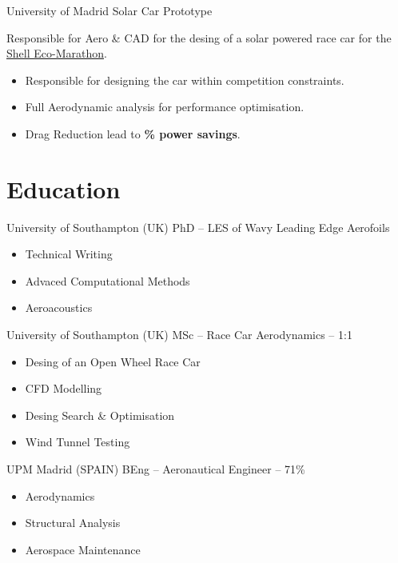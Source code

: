 \documentclass[fontsize=10pt]{tccv}
\begin{document}
\begin{eventlist}
     {University of Madrid}
     {Solar Car Prototype}

Responsible for Aero \& CAD for the desing of a solar powered race car for the \href{http://www.shell.com/global/environment-society/ecomarathon.html}{Shell Eco-Marathon}.
\begin{itemize}
\itemsep -1pt
	\item Responsible for designing the car within competition constraints.
        \item Full Aerodynamic analysis for performance optimisation.
	\item Drag Reduction lead to \textbf{\% power savings}.
\end{itemize}
\end{eventlist}


\section{Education}

\begin{eventlist}

     	{University of Southampton (UK)}
     	{PhD -- \normalsize{LES of Wavy Leading Edge Aerofoils}} 
	\begin{itemize}
	\itemsep -1pt
		\item Technical Writing
		\item Advaced Computational Methods
		\item Aeroacoustics
	\end{itemize}

     	{University of Southampton (UK)}
     	{MSc -- Race Car Aerodynamics -- 1:1} 
  	\begin{itemize}
	\itemsep -1pt
	   \item Desing of an Open Wheel Race Car
	   \item CFD Modelling
	   \item Desing Search \& Optimisation
	   \item Wind Tunnel Testing
	\end{itemize}

	{UPM Madrid (SPAIN)}
	{BEng -- Aeronautical Engineer -- 71\%}
  	\begin{itemize}
	\itemsep -1pt
	   \item Aerodynamics
	   \item Structural Analysis
	   \item Aerospace Maintenance
	\end{itemize}
\end{eventlist}
\end{document}
